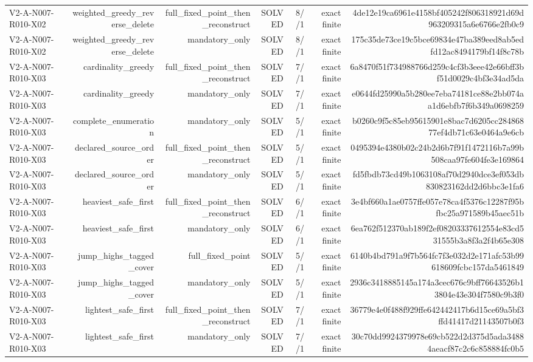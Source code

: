 {\begin{longtable}{lrrrrrr}
V2-A-N007-R010-X02 & weighted\_greedy\_reverse\_delete & full\_fixed\_point\_then\_reconstruct & SOLVED & 8//1 & exact finite & 4de12e19ca6961e4158bf405242f806318921d69d963209315a6e6766e2fb0c9 \\
V2-A-N007-R010-X02 & weighted\_greedy\_reverse\_delete & mandatory\_only & SOLVED & 8//1 & exact finite & 175c35de73ce19c5bce69834e47ba389eed8ab5edfd12ac8494179bf14f8c78b \\
V2-A-N007-R010-X03 & cardinality\_greedy & full\_fixed\_point\_then\_reconstruct & SOLVED & 7//1 & exact finite & 6a8470f51f734988766d259c4cf3b3eee42e66bff3bf51d0029c4bf3e34ad5da \\
V2-A-N007-R010-X03 & cardinality\_greedy & mandatory\_only & SOLVED & 7//1 & exact finite & e0644fd25990a5b280ee7eba74181ce88e2bb074aa1d6ebfb7f6b349a0698259 \\
V2-A-N007-R010-X03 & complete\_enumeration & mandatory\_only & SOLVED & 5//1 & exact finite & b0260c9f5c85eb95615901e8bac7d6205cc28486877ef4db71c63e0464a9e6cb \\
V2-A-N007-R010-X03 & declared\_source\_order & full\_fixed\_point\_then\_reconstruct & SOLVED & 5//1 & exact finite & 0495394e4380b02c24b2d6b7f91f1472116b7a99b508caa97fe604fe3e169864 \\
V2-A-N007-R010-X03 & declared\_source\_order & mandatory\_only & SOLVED & 5//1 & exact finite & fd5fbdb73cd49b1063108af70d2940dce3ef053db830823162dd2d6bbc3e1fa6 \\
V2-A-N007-R010-X03 & heaviest\_safe\_first & full\_fixed\_point\_then\_reconstruct & SOLVED & 6//1 & exact finite & 3e4bf660a1ae0757ffe057e78ca4f5376c12287f95bfbc25a971589b45aec51b \\
V2-A-N007-R010-X03 & heaviest\_safe\_first & mandatory\_only & SOLVED & 6//1 & exact finite & 6ea762f512370ab189f2ef08203337612554e83cd531555b3a8f3a2f4b65e308 \\
V2-A-N007-R010-X03 & jump\_highs\_tagged\_cover & full\_fixed\_point & SOLVED & 5//1 & exact finite & 6140b4bd791a9f7b564fc7f3e032d2e171afc53b99618609fcbc157da5461849 \\
V2-A-N007-R010-X03 & jump\_highs\_tagged\_cover & mandatory\_only & SOLVED & 5//1 & exact finite & 2936c3418885145a174a3cec676c9bff76643526b13804e43e304f7580c9b3f0 \\
V2-A-N007-R010-X03 & lightest\_safe\_first & full\_fixed\_point\_then\_reconstruct & SOLVED & 7//1 & exact finite & 36779e4e0f488f929ffe642442417b6d15ce69a5bf3ffd41417d21143507b0f3 \\
V2-A-N007-R010-X03 & lightest\_safe\_first & mandatory\_only & SOLVED & 7//1 & exact finite & 30c70dd9924379978e69cb522d2d375d5ada34884aeacf87c2c6c858884fc0b5 \\

\end{longtable}}
